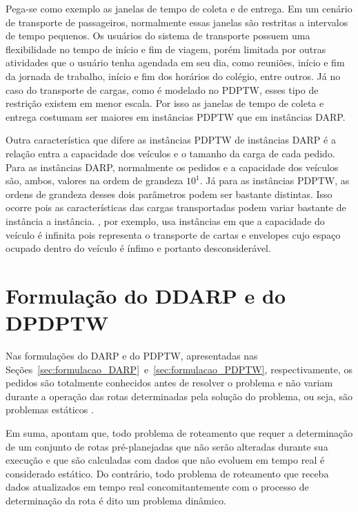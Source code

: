 Pega-se como exemplo as janelas de tempo de coleta e de entrega.
Em um cenário de transporte de passageiros, normalmente essas janelas são
restritas a intervalos de tempo pequenos.
Os usuários do sistema de transporte possuem uma flexibilidade no tempo de
início e fim de viagem, porém limitada por outras atividades que o
usuário tenha agendada em seu dia, como reuniões, início e fim da jornada de
trabalho, início e fim dos horários do colégio, entre outros.
Já no caso do transporte de cargas, como é modelado no PDPTW, esses tipo de
restrição existem em menor escala.
Por isso as janelas de tempo de coleta e entrega costumam ser maiores em
instâncias PDPTW que em instâncias DARP.

Outra característica que difere as instâncias PDPTW de instâncias DARP é a
relação entra a capacidade dos veículos e o tamanho da carga de cada pedido.
Para as instâncias DARP, normalmente os pedidos e a capacidade dos veículos 
são, ambos, valores na ordem de grandeza $10^1$.
Já para as instâncias PDPTW, as ordens de grandeza desses dois parâmetros podem
ser bastante distintas.
Isso ocorre pois as características das cargas transportadas podem variar
bastante de instância a instância.
\textcite{gendreau_neighborhood_2006}, por exemplo, usa instâncias em que a
capacidade do veículo é infinita pois representa o transporte de cartas e
envelopes cujo espaço ocupado dentro do veículo é ínfimo e portanto 
desconsiderável.
\fi

\section{Formulação do DDARP e do DPDPTW}

Nas formulações do DARP e do PDPTW, apresentadas nas
Seções~\ref{sec:formulacao_DARP}~e~\ref{sec:formulacao_PDPTW}, respectivamente,
os pedidos são totalmente conhecidos antes de resolver o problema e não variam 
durante a operação das rotas determinadas pela solução do problema, ou seja, 
são problemas estáticos \cite{psaraftis_dynamic_1988}.

Em suma, \textcite{psaraftis_dynamic_2015} apontam que, 
todo problema de roteamento que requer a determinação de um conjunto
de rotas pré-planejadas que não serão alteradas durante sua execução e que 
são calculadas com dados que não evoluem em tempo real é considerado estático.
Do contrário, todo problema de roteamento que receba dados atualizados em tempo
real concomitantemente com o processo de determinação da rota é dito um
problema dinâmico. 

